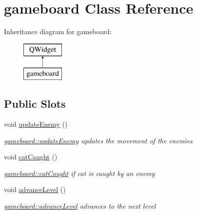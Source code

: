 \hypertarget{classgameboard}{}\section{gameboard Class Reference}
\label{classgameboard}
Inheritance diagram for gameboard\+:\begin{figure}[H]
\begin{center}
\leavevmode
\includegraphics[height=2.000000cm]{classgameboard}
\end{center}
\end{figure}
\subsection*{Public Slots}
\begin{DoxyCompactItemize}
\item 
\hypertarget{classgameboard_a68238b5385a056e5708be1f9918ef07d}{}void \hyperlink{classgameboard_a68238b5385a056e5708be1f9918ef07d}{update\+Enemy} ()\label{classgameboard_a68238b5385a056e5708be1f9918ef07d}

\begin{DoxyCompactList}\small\item\em \hyperlink{classgameboard_a68238b5385a056e5708be1f9918ef07d}{gameboard\+::update\+Enemy} updates the movement of the enemies \end{DoxyCompactList}\item 
\hypertarget{classgameboard_ab509115a3bc5d8c0fa11ced0abd293ed}{}void \hyperlink{classgameboard_ab509115a3bc5d8c0fa11ced0abd293ed}{cat\+Caught} ()\label{classgameboard_ab509115a3bc5d8c0fa11ced0abd293ed}

\begin{DoxyCompactList}\small\item\em \hyperlink{classgameboard_ab509115a3bc5d8c0fa11ced0abd293ed}{gameboard\+::cat\+Caught} if cat is caught by an enemy \end{DoxyCompactList}\item 
\hypertarget{classgameboard_a1c63304bc284a0d8e58934d4370b16ee}{}void \hyperlink{classgameboard_a1c63304bc284a0d8e58934d4370b16ee}{advance\+Level} ()\label{classgameboard_a1c63304bc284a0d8e58934d4370b16ee}

\begin{DoxyCompactList}\small\item\em \hyperlink{classgameboard_a1c63304bc284a0d8e58934d4370b16ee}{gameboard\+::advance\+Level} advances to the next level \end{DoxyCompactList}\end{DoxyCompactItemize}
